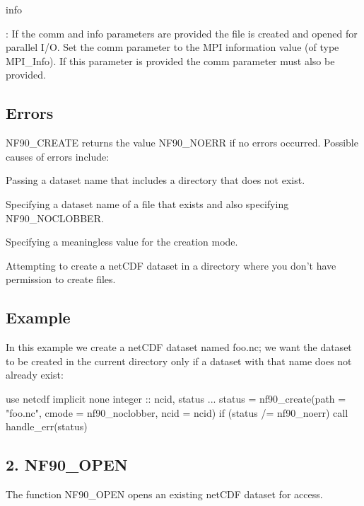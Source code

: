 {\ttfamily info}

\+: If the comm and info parameters are provided the file is created and opened for parallel I/O. Set the comm parameter to the M\+PI information value (of type M\+P\+I\+\_\+\+Info). If this parameter is provided the comm parameter must also be provided.

\subsection*{Errors}

N\+F90\+\_\+\+C\+R\+E\+A\+TE returns the value N\+F90\+\_\+\+N\+O\+E\+RR if no errors occurred. Possible causes of errors include\+:


\begin{DoxyItemize}
\item Passing a dataset name that includes a directory that does not exist.
\item Specifying a dataset name of a file that exists and also specifying N\+F90\+\_\+\+N\+O\+C\+L\+O\+B\+B\+ER.
\item Specifying a meaningless value for the creation mode.
\item Attempting to create a net\+C\+DF dataset in a directory where you don’t have permission to create files.
\end{DoxyItemize}

\subsection*{Example}

In this example we create a net\+C\+DF dataset named foo.\+nc; we want the dataset to be created in the current directory only if a dataset with that name does not already exist\+:


\begin{DoxyCode}
\textcolor{keywordtype}{use }netcdf
\textcolor{keywordtype}{implicit none}
\textcolor{keywordtype}{integer} :: ncid, status
...
status = nf90\_create(path = \textcolor{stringliteral}{"foo.nc"}, cmode = nf90\_noclobber, ncid = ncid)
\textcolor{keywordflow}{if} (status /= nf90\_noerr) \textcolor{keyword}{call }handle\_err(status)
\end{DoxyCode}
\hypertarget{f90_datasets_f90-nf90_open}{}\subsection{2. N\+F90\+\_\+\+O\+P\+E\+N }\label{f90_datasets_f90-nf90_open}
The function N\+F90\+\_\+\+O\+P\+EN opens an existing net\+C\+DF dataset for access.

